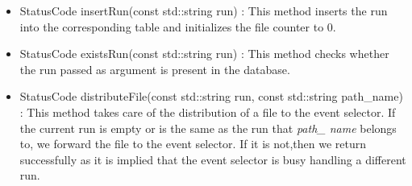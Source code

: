 \begin{itemize}
\item StatusCode insertRun(const std::string run) : This method inserts the run into the corresponding table and initializes the file counter to 0.\par

\item StatusCode existsRun(const std::string run) : This method checks whether the run passed as argument is present in the database.\par

\item StatusCode distributeFile(const std::string run, const std::string path\_name) : This method takes care of the distribution of a file to the event selector. If the current run is empty or is the same as the run that \textit{path\_ name} belongs to, we forward the file to the event selector. If it is not,then we return successfully as it is implied that the event selector is busy handling a different run.\par
\end{itemize}


